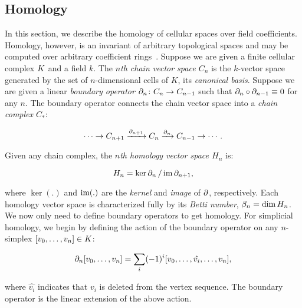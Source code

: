 \documentclass{elsarticle}
\begin{document}
\subsection{Homology}
In this section, we describe the homology of cellular spaces over 
field coefficients. Homology, however, is an invariant of arbitrary topological 
spaces and may be computed over arbitrary coefficient rings~\cite{hatcher}.  
Suppose we are given a finite cellular complex $K$ and a field $k$. 
The \emph{$n$th chain vector space $C_n$} is the $k$-vector space generated by 
the set of $n$-dimensional cells of $K$, its \emph{canonical basis}.  
Suppose we are given a linear \emph{boundary operator} 
$\partial_n\colon C_n \rightarrow C_{n-1}$ such that 
$\partial_n \circ \partial_{n-1} \equiv 0$ for any $n$.  
The boundary operator connects the chain vector space into a 
\emph{chain complex $C_*$}:
\begin{linenomath*}
\begin{equation*}
  \cdots \rightarrow             C_{n+1}
         \xrightarrow{\partial_{n+1}}  C_n
         \xrightarrow{\partial_n}     C_{n-1}
         \rightarrow \cdots .
\label{eqn:chaincomplex}
\end{equation*}
\end{linenomath*}
Given any chain complex, the \emph{$n$th homology vector space $H_n$} is:
\begin{linenomath*}
\begin{equation}
  \label{eqn:homology}
  H_n = {\ker{\ensuremath{\partial}_n}}\,/\,{\operatorname{im}{\partial_{n+1}}}, 
\end{equation}
\end{linenomath*}
where $\ker(.)$ and $\operatorname{im}(.)$ are the \emph{kernel} and \emph{image} of $\partial$, 
respectively.
Each homology vector space is characterized fully by its \emph{Betti number}, 
$\beta_n = \dim{H_n}$.  
We now only need to define boundary operators to get homology. 
For simplicial homology, we begin by defining the action of the boundary operator on any
$n$-simplex $[v_0,\ldots,v_n] \in K$:
\begin{linenomath*}
\begin{equation*}
\partial_n [v_0,\ldots,v_n] = \sum_i (-1)^i [v_0,\ldots,\hat{v_i},\ldots,v_n],
\end{equation*}
\end{linenomath*}
where $\hat{v_i}$ indicates that $v_i$ is deleted from the vertex 
sequence. The boundary operator is the linear extension of the above action.
\end{document}
